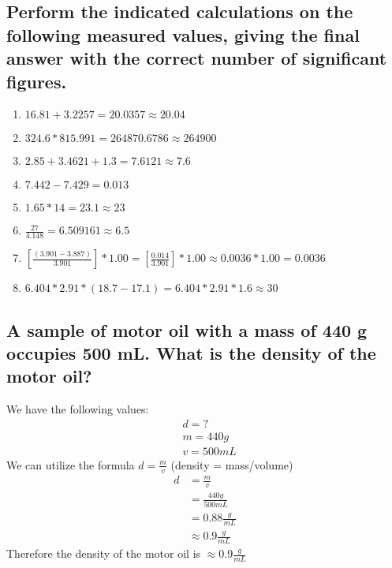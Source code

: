 \documentclass{scrartcl}
\begin{document}
\subsection{Perform the indicated calculations on the following measured values, giving the final answer with the correct number of significant figures.}
\label{sec:org0fede97}
\begin{enumerate}
\item \(16.81 + 3.2257 = 20.0357 \approx 20.04\)
\item \(324.6 * 815.991 = 264870.6786 \approx 264900\)
\item \(2.85 + 3.4621 + 1.3 = 7.6121 \approx 7.6\)
\item \(7.442 - 7.429 = 0.013\)
\item \(1.65 * 14 = 23.1 \approx 23\)
\item \(\frac{27}{4.148} = 6.509161 \approx 6.5\)
\item \([\frac{(3.901 - 3.887)}{3.901}] * 1.00 = [\frac{0.014}{3.901}] * 1.00 \approx 0.0036 * 1.00 = 0.0036\)
\item \(6.404 * 2.91 * (18.7 - 17.1) = 6.404 * 2.91 * 1.6 \approx 30\)
\end{enumerate}

\subsection{A sample of motor oil with a mass of 440 g occupies 500 mL. What is the density of the motor oil?}
\label{sec:orge81487d}
We have the following values:
\begin{align*}
&d = ?\\
&m = 440g\\
&v = 500mL
\end{align*}
We can utilize the formula \(d=\frac{m}{v}\) (density = mass/volume)
\begin{align*}
d&=\frac{m}{v}\\
&=\frac{440g}{500mL}\\
&=0.88\frac{g}{mL}\\
&\approx0.9\frac{g}{mL}
\end{align*}
Therefore the density of the motor oil is \(\approx0.9\frac{g}{mL}\)
\end{document}

